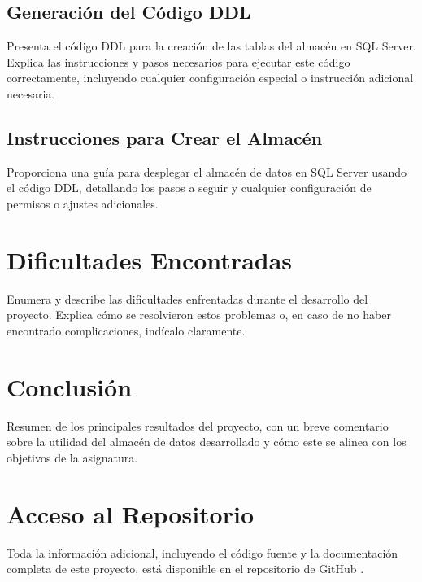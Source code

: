 \documentclass{article}
\begin{document}
\subsection{Generación del Código DDL}
Presenta el código DDL para la creación de las tablas del almacén en SQL Server. Explica las instrucciones y pasos necesarios para ejecutar este código correctamente, incluyendo cualquier configuración especial o instrucción adicional necesaria.

\subsection{Instrucciones para Crear el Almacén}
Proporciona una guía para desplegar el almacén de datos en SQL Server usando el código DDL, detallando los pasos a seguir y cualquier configuración de permisos o ajustes adicionales.

\section{Dificultades Encontradas}
\label{sec:dificultades_encontradas}
Enumera y describe las dificultades enfrentadas durante el desarrollo del proyecto. Explica cómo se resolvieron estos problemas o, en caso de no haber encontrado complicaciones, indícalo claramente.

\section{Conclusión}
\label{sec:conclusion}
Resumen de los principales resultados del proyecto, con un breve comentario sobre la utilidad del almacén de datos desarrollado y cómo este se alinea con los objetivos de la asignatura.


\newpage
\section{Acceso al Repositorio}

Toda la información adicional, incluyendo el código fuente y la documentación completa de este proyecto, está disponible en el repositorio de GitHub \cite{silva2024github}.

\end{document}
